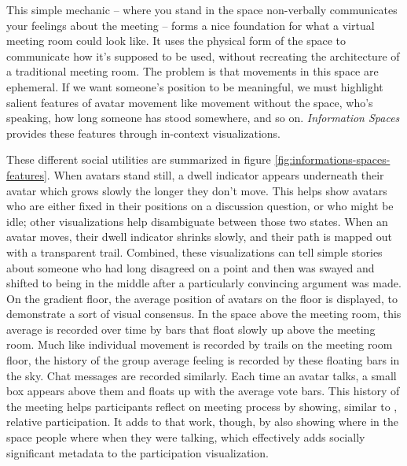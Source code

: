 \documentclass{tufte-handout}
\begin{document}
This simple mechanic -- where you stand in the space non-verbally communicates your feelings about the meeting -- forms a nice foundation for what a virtual meeting room could look like. It uses the physical form of the space to communicate how it's supposed to be used, without recreating the architecture of a traditional meeting room. The problem is that movements in this space are ephemeral. If we want someone's position to be meaningful, we must highlight salient features of avatar movement like movement without the space, who's speaking, how long someone has stood somewhere, and so on. \emph{Information Spaces} provides these features through in-context visualizations.


These different social utilities are summarized in figure \ref{fig:informations-spaces-features}. When avatars stand still, a dwell indicator appears underneath their avatar which grows slowly the longer they don't move. This helps show avatars who are either fixed in their positions on a discussion question, or who might be idle; other visualizations help disambiguate between those two states. When an avatar moves, their dwell indicator shrinks slowly, and their path is mapped out with a transparent trail. Combined, these visualizations can tell simple stories about someone who had long disagreed on a point and then was swayed and shifted to being in the middle after a particularly convincing argument was made. On the gradient floor, the average position of avatars on the floor is displayed, to demonstrate a sort of visual consensus. In the space above the meeting room, this average is recorded over time by bars that float slowly up above the meeting room. Much like individual movement is recorded by trails on the meeting room floor, the history of the group average feeling is recorded by these floating bars in the sky. Chat messages are recorded similarly. Each time an avatar talks, a small box appears above them and floats up with the average vote bars. This history of the meeting helps participants reflect on meeting process by showing, similar to \citep{DiMicco:2007ie}, relative participation. It adds to that work, though, by also showing where in the space people where when they were talking, which effectively adds socially significant metadata to the participation visualization.


\end{document}
